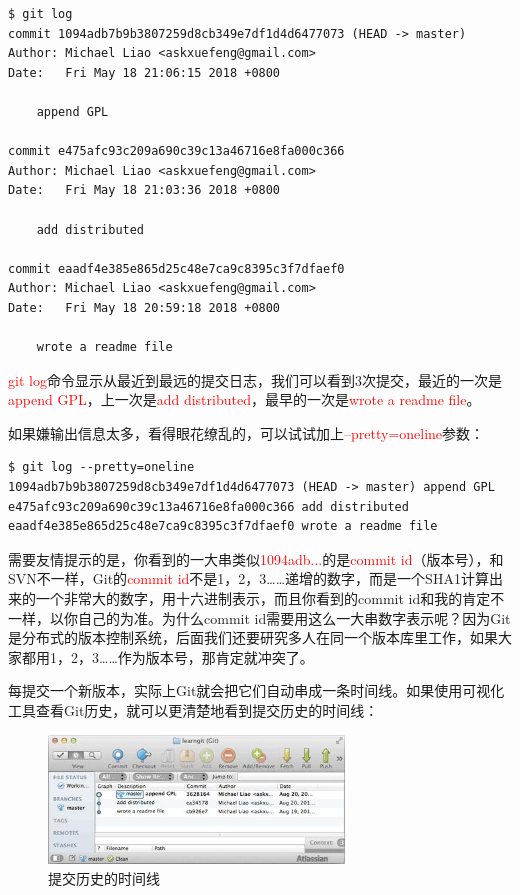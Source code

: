 \begin{verbatim}
$ git log
commit 1094adb7b9b3807259d8cb349e7df1d4d6477073 (HEAD -> master)
Author: Michael Liao <askxuefeng@gmail.com>
Date:   Fri May 18 21:06:15 2018 +0800

    append GPL

commit e475afc93c209a690c39c13a46716e8fa000c366
Author: Michael Liao <askxuefeng@gmail.com>
Date:   Fri May 18 21:03:36 2018 +0800

    add distributed

commit eaadf4e385e865d25c48e7ca9c8395c3f7dfaef0
Author: Michael Liao <askxuefeng@gmail.com>
Date:   Fri May 18 20:59:18 2018 +0800

    wrote a readme file
\end{verbatim}

\textcolor{red}{git log}命令显示从最近到最远的提交日志，我们可以看到3次提交，最近的一次是\textcolor{red}{append GPL}，上一次是\textcolor{red}{add distributed}，最早的一次是\textcolor{red}{wrote a readme file}。

如果嫌输出信息太多，看得眼花缭乱的，可以试试加上\textcolor{red}{--pretty=oneline}参数：

\begin{verbatim}
$ git log --pretty=oneline
1094adb7b9b3807259d8cb349e7df1d4d6477073 (HEAD -> master) append GPL
e475afc93c209a690c39c13a46716e8fa000c366 add distributed
eaadf4e385e865d25c48e7ca9c8395c3f7dfaef0 wrote a readme file
\end{verbatim}

需要友情提示的是，你看到的一大串类似\textcolor{red}{1094adb...}的是\textcolor{red}{commit id}（版本号），和SVN不一样，Git的\textcolor{red}{commit id}不是1，2，3……递增的数字，而是一个SHA1计算出来的一个非常大的数字，用十六进制表示，而且你看到的commit id和我的肯定不一样，以你自己的为准。为什么commit id需要用这么一大串数字表示呢？因为Git是分布式的版本控制系统，后面我们还要研究多人在同一个版本库里工作，如果大家都用1，2，3……作为版本号，那肯定就冲突了。

每提交一个新版本，实际上Git就会把它们自动串成一条时间线。如果使用可视化工具查看Git历史，就可以更清楚地看到提交历史的时间线：

\begin{figure}[h]
    \centering
    \includegraphics[width=0.7\textwidth]{img/git-log-timeline.jpg}
    \caption{提交历史的时间线}
    \label{fig:mesh1}
\end{figure}


